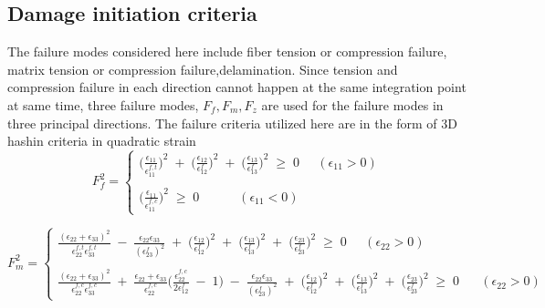 \subsection{Damage initiation criteria}
\indent\indent\indent   The failure modes considered here include fiber tension or compression failure, matrix tension or compression failure,delamination. Since tension and compression failure in each direction cannot happen at the same integration  point at same time, three failure modes, $F_{f}, F_{m}, F_{z} $ are used for the failure modes in three principal directions. The failure criteria utilized here are in the form of 3D hashin criteria in quadratic strain
\begin{equation}
F_{f}^{2} =  
	\begin{cases}
	\Big(\frac{\epsilon_{11}}{\epsilon_{11}^{f,t}}\Big)^{2} \; + \; \Big(\frac{\epsilon_{12}}{\epsilon_{12}^{f}}\Big)^{2} \; + \; \Big(\frac{\epsilon_{13}}{\epsilon_{13}^{f}}\Big)^{2} \; \geq  \; 0  \; \; \; \; \;  (\epsilon_{11}  >  0)  \\
	\\
	\Big(\frac{\epsilon_{11}}{\epsilon_{11}^{f,c}}\Big)^{2}  \; \geq  \; 0 \; \; \; \; \; \; \;  \; \; \; \;  (\epsilon_{11}  <  0) 
	
	\end{cases}
\end{equation}

\begin{equation}
F_{m}^{2} =  
	\begin{cases}
	
	\frac{(\epsilon_{22} + \epsilon_{33} )^{2}}{\epsilon_{22}^{f,t} \epsilon_{33}^{f,t}} \;  - \; \frac{\epsilon_{22}\epsilon_{33}}{(\epsilon_{23}^{f})^{2}} \; + \; \Big(\frac{\epsilon_{12}}{\epsilon_{12}^{f}}\Big)^{2} \; + \; \Big(\frac{\epsilon_{13}}{\epsilon_{13}^{f}}\Big)^{2} \;  + \; \Big(\frac{\epsilon_{23}}{\epsilon_{23}^{f}}\Big)^{2} \;\geq  \; 0 \; \; \; \; \;  (\epsilon_{22}  >  0) \\
	\\
	
	\frac{(\epsilon_{22} + \epsilon_{33} )^{2}}{\epsilon_{22}^{f,c} \epsilon_{33}^{f,c}} \; +  \;  \frac{\epsilon_{22} + \epsilon_{33}}{\epsilon_{22}^{f,c}}\Big(\frac{\epsilon_{22}^{f,c}}{2\epsilon_{12}^{f}} \; - \; 1\Big) \;  - \; \frac{\epsilon_{22}\epsilon_{33}}{(\epsilon_{23}^{f})^{2}} \; + \; \Big(\frac{\epsilon_{12}}{\epsilon_{12}^{f}}\Big)^{2} \; + \; \Big(\frac{\epsilon_{13}}{\epsilon_{13}^{f}}\Big)^{2} \;  + \; \Big(\frac{\epsilon_{23}}{\epsilon_{23}^{f}}\Big)^{2} \;\geq \; 0 \; \; \; \; \; \;  (\epsilon_{22}  >  0) 
	 
	
	\end{cases}
\end{equation}


